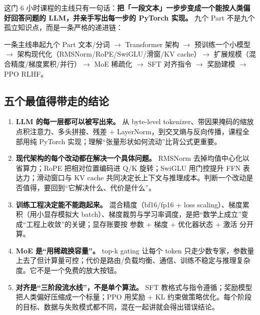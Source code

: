 
这门 6 小时课程的主线只有一句话：\textbf{把「一段文本」一步步变成一个能按人类偏好回答问题的 LLM，并亲手写出每一步的 PyTorch 实现。} 九个 Part 不是九个孤立知识点，而是一条严格的递进链：

\begin{importantbox}{一条主线串起九个 Part}
文本/分词 $\rightarrow$ Transformer 架构 $\rightarrow$ 预训练一个小模型 $\rightarrow$ 架构现代化（RMSNorm/RoPE/SwiGLU/滑窗/KV cache）$\rightarrow$ 扩展规模（混合精度/梯度累积/并行）$\rightarrow$ MoE 稀疏化 $\rightarrow$ SFT 对齐指令 $\rightarrow$ 奖励建模 $\rightarrow$ PPO RLHF。
\end{importantbox}

\subsection{五个最值得带走的结论}

\begin{enumerate}
  \item \textbf{LLM 的每一层都可以被写出来。} 从 byte-level tokenizer、带因果掩码的缩放点积注意力、多头拼接、残差 + LayerNorm，到交叉熵与反向传播，课程全部用纯 PyTorch 实现；理解“张量形状如何流动”比背公式更重要。
  \item \textbf{现代架构的每个改动都在解决一个具体问题。} RMSNorm 去掉均值中心化以省算力；RoPE 把相对位置编码进 Q/K 旋转；SwiGLU 用门控提升 FFN 表达力；滑动窗口与 KV cache 共同决定长上下文与推理成本。判断一个改动是否值得，要回到“它解决什么、代价是什么”。
  \item \textbf{训练工程决定能不能跑起来。} 混合精度（bf16/fp16 + loss scaling）、梯度累积（用小显存模拟大 batch）、梯度裁剪与学习率调度，是把“数学上成立”变成“工程上收敛”的关键；显存账要按 参数 + 梯度 + 优化器状态 + 激活 分开算。
  \item \textbf{MoE 是“用稀疏换容量”。} top-k gating 让每个 token 只走少数专家，参数量上去了但计算量可控；代价是路由/负载均衡、通信、训练不稳定与推理复杂度。它不是一个免费的放大按钮。
  \item \textbf{对齐是“三阶段流水线”，不是单个算法。} SFT 教格式与指令遵循；奖励模型把人类偏好压缩成一个标量；PPO 用奖励 + KL 约束做策略优化。每个阶段的目标、数据与失败模式都不同，混在一起讲就会得出错误结论。
\end{enumerate}


